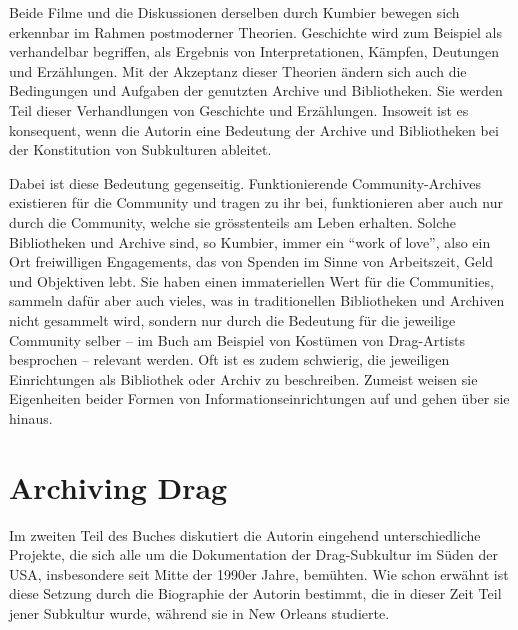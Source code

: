 \documentclass[a4paper,
fontsize=11pt,
oneside,
numbers=noperiodatend,
parskip=half-,
bibliography=totoc,
final
]{scrartcl}
\begin{document}
Beide Filme und die Diskussionen derselben durch Kumbier bewegen sich
erkennbar im Rahmen postmoderner Theorien. Geschichte wird zum Beispiel
als verhandelbar begriffen, als Ergebnis von Interpretationen, Kämpfen,
Deutungen und Erzählungen. Mit der Akzeptanz dieser Theorien ändern sich
auch die Bedingungen und Aufgaben der genutzten Archive und
Bibliotheken. Sie werden Teil dieser Verhandlungen von Geschichte und
Erzählungen. Insoweit ist es konsequent, wenn die Autorin eine Bedeutung
der Archive und Bibliotheken bei der Konstitution von Subkulturen
ableitet.

Dabei ist diese Bedeutung gegenseitig. Funktionierende
Community-Archives existieren für die Community und tragen zu ihr bei,
funktionieren aber auch nur durch die Community, welche sie
grösstenteils am Leben erhalten. Solche Bibliotheken und Archive sind,
so Kumbier, immer ein \enquote{work of love}, also ein Ort freiwilligen
Engagements, das von Spenden im Sinne von Arbeitszeit, Geld und
Objektiven lebt. Sie haben einen immateriellen Wert für die Communities,
sammeln dafür aber auch vieles, was in traditionellen Bibliotheken und
Archiven nicht gesammelt wird, sondern nur durch die Bedeutung für die
jeweilige Community selber -- im Buch am Beispiel von Kostümen von
Drag-Artists besprochen -- relevant werden. Oft ist es zudem schwierig,
die jeweiligen Einrichtungen als Bibliothek oder Archiv zu beschreiben.
Zumeist weisen sie Eigenheiten beider Formen von
Informationseinrichtungen auf und gehen über sie hinaus.

\section*{Archiving Drag}\label{archiving-drag}

Im zweiten Teil des Buches diskutiert die Autorin eingehend
unterschiedliche Projekte, die sich alle um die Dokumentation der
Drag-Subkultur im Süden der USA, insbesondere seit Mitte der 1990er
Jahre, bemühten. Wie schon erwähnt ist diese Setzung durch die
Biographie der Autorin bestimmt, die in dieser Zeit Teil jener Subkultur
wurde, während sie in New Orleans studierte.
\end{document}
